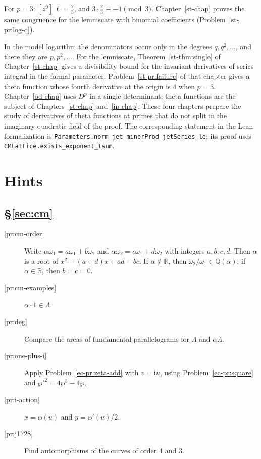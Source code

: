 \documentclass[reqno]{amsart}
\newcounter{chap}
\theoremstyle{definition}
\theoremstyle{plain}
\newcommand{\Q}{\mathbb{Q}}
\newcommand{\ii}{\mathrm{i}}
\begin{document}
For \(p = 3\): \([z^9]\,\ell = \tfrac23\), and \(3 \cdot \tfrac23 \equiv -1 \pmod 3\).  Chapter~\ref{st-chap} proves the same congruence for the lemniscate with binomial coefficients (Problem~\ref{st-pr:log-q}).

In the model logarithm the denominators occur only in the degrees \(q, q^2, \dotsc\), and there they are \(p, p^2, \dotsc\).  For the lemniscate, Theorem~\ref{st-thm:single} of Chapter~\ref{st-chap} gives a divisibility bound for the invariant derivatives of series integral in the formal parameter.  Problem~\ref{st-pr:failure} of that chapter gives a theta function whose fourth derivative at the origin is \(4\) when \(p=3\).  Chapter~\ref{od-chap} uses \(D^p\) in a single determinant; theta functions are the subject of Chapters~\ref{st-chap} and~\ref{ip-chap}.  These four chapters prepare the study of derivatives of theta functions at primes that do not split in the imaginary quadratic field of the proof.  The corresponding statement in the Lean formalization is \texttt{Parameters.norm\_jet\_minorProd\_jetSeries\_le}; its proof uses \texttt{CMLattice.exists\_exponent\_tsum}.

\section*{Hints}

\subsection*{\S\ref{sec:cm}}
\begin{description}
\item[\ref{pr:cm-order}] Write \(\alpha\omega_1 = a\omega_1 + b\omega_2\) and \(\alpha\omega_2 = c\omega_1 + d\omega_2\) with integers \(a, b, c, d\).  Then \(\alpha\) is a root of \(x^2 - (a+d)x + ad - bc\).  If \(\alpha \notin \mathbb{R}\), then \(\omega_2/\omega_1 \in \Q(\alpha)\); if \(\alpha \in \mathbb{R}\), then \(b = c = 0\).
\item[\ref{pr:cm-examples}] \(\alpha \cdot 1 \in \Lambda\).
\item[\ref{pr:deg}] Compare the areas of fundamental parallelograms for \(\Lambda\) and \(\alpha\Lambda\).
\item[\ref{pr:one-plus-i}] Apply Problem~\ref{ec-pr:zeta-add} with \(v = \ii u\), using Problem~\ref{ec-pr:square} and \(\wp'^2 = 4\wp^3 - 4\wp\).
\item[\ref{pr:i-action}] \(x = \wp(u)\) and \(y = \wp'(u)/2\).
\item[\ref{pr:j1728}] Find automorphisms of the curves of order \(4\) and \(3\).
\end{description}
\end{document}
